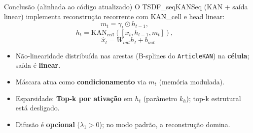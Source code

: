 \documentclass[10pt]{beamer}
\begin{document}
\begin{frame}{Conclus\~ao (alinhada ao c\'odigo atualizado)}
O TSDF\_seqKANSeq (KAN + sa\'ida linear) implementa reconstru\c{c}\~ao recorrente com KAN\_cell e head linear:
\[
m_t=\gamma_t\odot h_{t-1},\quad
\]
\[
h_t=\mathrm{KAN}_{cell}([x_t,h_{t-1},m_t]),\quad
\]
\[
\hat{x}_t=W_{out}h_t+b_{out}
\]

\begin{itemize}
\item N\~ao-linearidade distribu\'ida nas arestas (B-splines do \texttt{ArticleKAN}) na \textbf{c\'elula}; sa\'ida \'{e} \textbf{linear}.
\item M\'ascara atua como \textbf{condicionamento} via $m_t$ (mem\'oria modulada).
\item Esparsidade: \textbf{Top-k por ativa\c{c}\~ao} em $h_t$ (par\^ametro $k_h$); top-k estrutural est\'a desligado.
\item Difus\~ao \'e \textbf{opcional} ($\lambda_1>0$); no modo padr\~ao, a reconstru\c{c}\~ao domina.
\end{itemize}
\end{frame}
\end{document}
